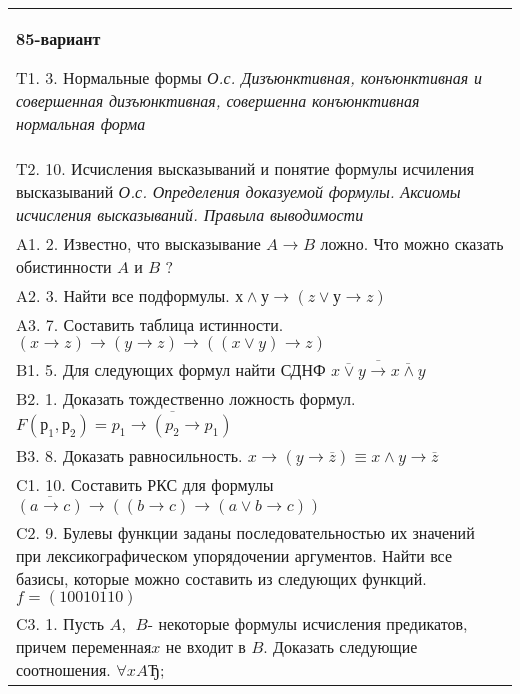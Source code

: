 \documentclass{article}
\begin{document}
\begin{tabular}{m{17cm}}
\textbf{85-вариант}
\newline

T1. 3. Нормальные формы \emph{О.с. Дизъюнктивная, конъюнктивная и совершенная дизъюнктивная, совершенна конъюнктивная нормальная форма} \\
T2. 10. Исчисления высказываний и понятие формулы исчиления высказываний \emph{О.с. Определения доказуемой формулы. Аксиомы исчисления высказываний. Правыла выводимости} \\
A1. 2. Известно, что высказывание \(A \rightarrow B\) ложно. Что можно сказать обистинности \(A\) и \(B\) ? \\
A2. 3. Найти все подформулы. \(х \land у \rightarrow (z \vee у \rightarrow z)\) \\
A3. 7. Составить таблица истинности. \((x \rightarrow z) \rightarrow (y \rightarrow z) \rightarrow ((x \vee y) \rightarrow z)\) \\
B1. 5. Для следующих формул найти СДНФ \(\overline{\overline{x \vee y} \rightarrow \overline{x \land y}}\) \\
B2. 1. Доказать тождественно ложность формул. \(F\left( р_{1},р_{2} \right) = \overline{p_{1} \rightarrow (p_{2} \rightarrow p_{1})}\) \\
B3. 8. Доказать равносильность. \(x \rightarrow \left( y \rightarrow \overline{z} \right) \equiv x \land y \rightarrow \overline{z}\) \\
C1. 10. Составить РКС для формулы \(\overline{(a \rightarrow c)} \rightarrow \left( (b \rightarrow c) \rightarrow (a \vee b \rightarrow c) \right)\) \\
C2. 9. Булевы функции заданы последовательностью их значений при лексикографическом упорядочении аргументов. Найти все базисы, которые можно составить из следующих функций. \(f = (10010110)\) \\
C3. 1. Пусть \(A,\ \ B\)- некоторые формулы исчисления предикатов, причем переменная\(x\) не входит в \(B\). Доказать следующие соотношения. \(\forall xAЂ\); \\

\end{tabular}
\vspace{1cm}
\end{document}
